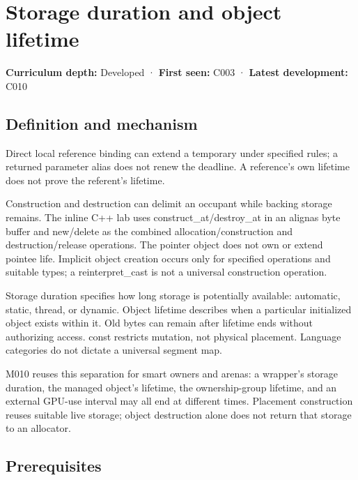 \hypertarget{appendix-0b104bcba06b}{}\label{referencestart:appendix-0b104bcba06b}
\section{Storage duration and object lifetime}\label{appendix-0b104bcba06b-storage-duration-and-object-lifetime}

\textbf{Curriculum depth:} Developed · \textbf{First seen:} C003 · \textbf{Latest development:} C010

\begin{allmightroledefinition}

\subsection{Definition and mechanism}\label{appendix-0b104bcba06b-definition-and-mechanism}

Direct local reference binding can extend a temporary under specified rules; a returned parameter alias does not renew the deadline. A reference's own lifetime does not prove the referent's lifetime.

\end{allmightroledefinition}

Construction and destruction can delimit an occupant while backing storage remains. The inline C++ lab uses construct\_at/destroy\_at in an alignas byte buffer and new/delete as the combined allocation/construction and destruction/release operations. The pointer object does not own or extend pointee life. Implicit object creation occurs only for specified operations and suitable types; a reinterpret\_cast is not a universal construction operation.

Storage duration specifies how long storage is potentially available: automatic, static, thread, or dynamic. Object lifetime describes when a particular initialized object exists within it. Old bytes can remain after lifetime ends without authorizing access. const restricts mutation, not physical placement. Language categories do not dictate a universal segment map.

M010 reuses this separation for smart owners and arenas: a wrapper's storage duration, the managed object's lifetime, the ownership-group lifetime, and an external GPU-use interval may all end at different times. Placement construction reuses suitable live storage; object destruction alone does not return that storage to an allocator.

\subsection{Prerequisites}\label{appendix-0b104bcba06b-prerequisites}

